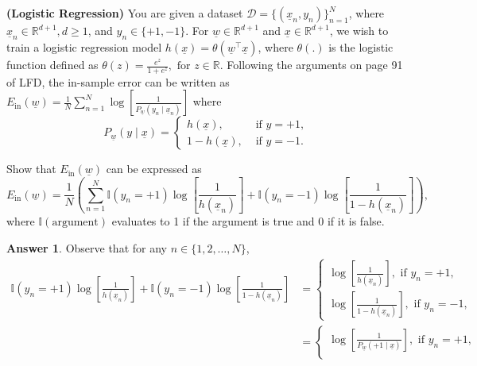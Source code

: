 \documentclass{article}
\theoremstyle{definition}
\newtheorem*{answer}{Answer}
\begin{document}
\begin{question}
	\item \textbf{(Logistic Regression)} You are given a dataset $\mathcal{D} = \{(\underline{x}_n, y_n)\}_{n=1}^N$, where $\underline{x}_n \in \mathbb{R}^{d+1}, d \geq 1$, and $y_n \in \{+1,-1\}$. For $\underline{w} \in \mathbb{R}^{d+1}$ and $\underline{x} \in \mathbb{R}^{d+1}$, we wish to train a logistic regression model $h(\underline{x}) = \theta(\underline{w}^\top \underline{x})$, where $\theta(.)$ is the logistic function defined as $\theta(z) = \frac{e^z}{1 + e^z}, \text{ for } z \in \mathbb{R}$. Following the arguments on page 91 of LFD, the in-sample error can be written as
	$E_{\text{in}}(\underline{w}) = \frac{1}{N} \sum_{n=1}^N \log\left[\frac{1}{P_{\underline{w}}(y_n \mid \underline{x}_n)}\right]$ where
	\begin{equation*}
	P_{\underline{w}}(y \mid \underline{x}) = \begin{cases}
		h(\underline{x}), & \text{ if }y = +1, \\
		1 - h(\underline{x}), & \text{ if }y = -1.
	\end{cases}
	\end{equation*}
	\begin{question}
		\item Show that $E_{\text{in}}(\underline{w})$ can be expressed as
		\begin{equation*}
			E_{\text{in}}(\underline{w}) = \frac{1}{N} \left( \sum_{n=1}^N \mathbb{I}(y_n = +1) \log\left[\frac{1}{h(\underline{x}_n)}\right] + \mathbb{I}(y_n = -1) \log\left[\frac{1}{1 - h(\underline{x}_n)}\right] \right),
		\end{equation*}
		where $\mathbb{I}(\text{argument})$ evaluates to 1 if the argument is true and 0 if it is false.
		\begin{answer}
			Observe that for any $n \in \{1, 2, \ldots, N\}$,
			\begin{align*}
				\mathbb{I}(y_n = +1) \log\left[\frac{1}{h(\underline{x}_n)}\right] + \mathbb{I}(y_n = -1) \log\left[\frac{1}{1 - h(\underline{x}_n)}\right] &= \begin{cases*}
					\log\left[\frac{1}{h(\underline{x}_n)}\right], \text{ if }y_n=+1,\\
					\log\left[\frac{1}{1-h(\underline{x}_n)}\right], \text{ if }y_n=-1,
				\end{cases*}\\
				&= \begin{cases*}
					\log\left[\frac{1}{P_{\underline{w}}(+1 \mid \underline{x})}\right], \text{ if }y_n=+1,\\

\end{cases*}
\end{align*}
\end{answer}
\end{question}
\end{question}
\end{document}
